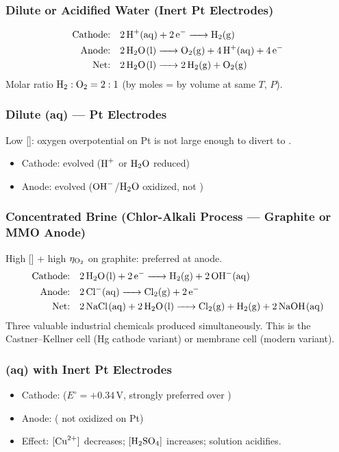 \subsubsection{Dilute  or Acidified Water (Inert Pt Electrodes)}
\begin{align*}
\text{Cathode:}& \quad \ce{2H+(aq) + 2e- -> H2(g)}\\
\text{Anode:}& \quad \ce{2H2O(l) -> O2(g) + 4H+(aq) + 4e-}\\
\text{Net:}& \quad \ce{2H2O(l) -> 2H2(g) + O2(g)}
\end{align*}
Molar ratio $\ce{H2}:\ce{O2} = 2:1$ (by moles = by volume at same $T$, $P$).

\subsubsection{Dilute (aq) --- Pt Electrodes}
Low []: oxygen overpotential on Pt is not large enough to divert to .
\begin{itemize}
    \item Cathode:  evolved ($\ce{H+}$ or $\ce{H2O}$ reduced)
    \item Anode:  evolved ($\ce{OH-}$/$\ce{H2O}$ oxidized, not )
\end{itemize}

\subsubsection{Concentrated  Brine (Chlor-Alkali Process --- Graphite or MMO Anode)}
High [] + high $\eta_{\ce{O2}}$ on graphite:  preferred at anode.
\begin{align*}
\text{Cathode:}& \quad \ce{2H2O(l) + 2e- -> H2(g) + 2OH-(aq)}\\
\text{Anode:}& \quad \ce{2Cl-(aq) -> Cl2(g) + 2e-}\\
\text{Net:}& \quad \ce{2NaCl(aq) + 2H2O(l) -> Cl2(g) + H2(g) + 2NaOH(aq)}
\end{align*}
Three valuable industrial chemicals produced simultaneously. This is the Castner--Kellner cell (Hg cathode variant) or membrane cell (modern variant).

\subsubsection{(aq) with Inert Pt Electrodes}
\begin{itemize}
    \item Cathode:  ($E^\circ = +0.34\,\text{V}$, strongly preferred over )
    \item Anode:  ( not oxidized on Pt)
    \item Effect: $[\ce{Cu^2+}]$ decreases; $[\ce{H2SO4}]$ increases; solution acidifies.
\end{itemize}

